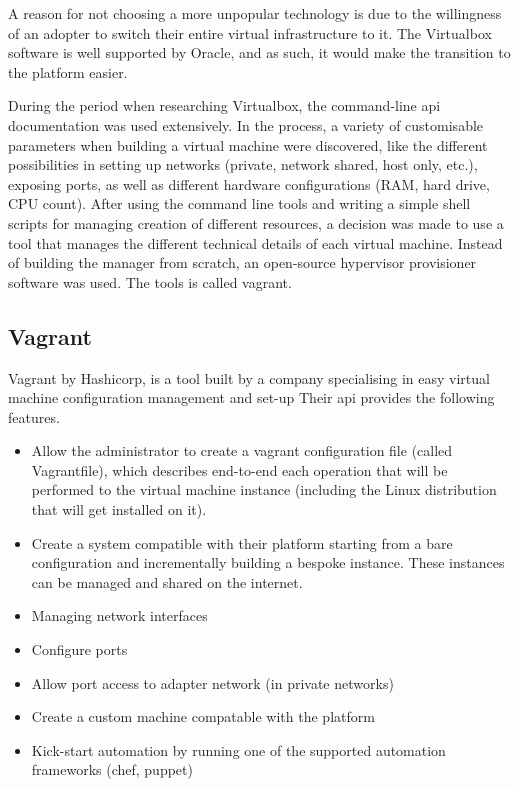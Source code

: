 \documentclass{article}
\begin{document}
A reason for not choosing a more unpopular technology is due to the willingness of an adopter to switch their entire virtual infrastructure to it. The Virtualbox software is well supported by Oracle, and as such, it would make the transition to the platform easier.

During the period when researching Virtualbox, the command-line \gls{api} documentation was used extensively. In the process, a variety of customisable parameters when building a virtual machine were discovered, like the different possibilities in setting up networks (private, network shared, host only, etc.), exposing ports, as well as different hardware configurations (RAM, hard drive, CPU count). After using the command line tools and writing a simple shell scripts for managing creation of different resources, a decision was made to use a tool that manages the different technical details of each virtual machine. Instead of building the manager from scratch, an open-source hypervisor provisioner software was used. The tools is called \gls{vagrant}.

\subsection{Vagrant}
Vagrant by Hashicorp, is a tool built by a company specialising in easy virtual machine configuration management and set-up Their \gls{api} provides the following features.

\begin{itemize}
	\item
	Allow the administrator to create a \gls{vagrant} configuration file (called Vagrantfile), which describes end-to-end each operation that will be performed to the virtual machine instance (including the Linux distribution that will get installed on it).
	\item
	Create a system compatible with their platform starting from a bare configuration and incrementally building a bespoke instance. These instances can be managed and shared on the internet.
	\item
	Managing network interfaces
	\item
	Configure ports
	\item
	Allow port access to adapter network (in private networks)
	\item
	Create a custom machine compatable with the platform
	\item
	Kick-start automation by running one of the supported automation frameworks (chef, puppet)
\end{itemize}
\end{document}
